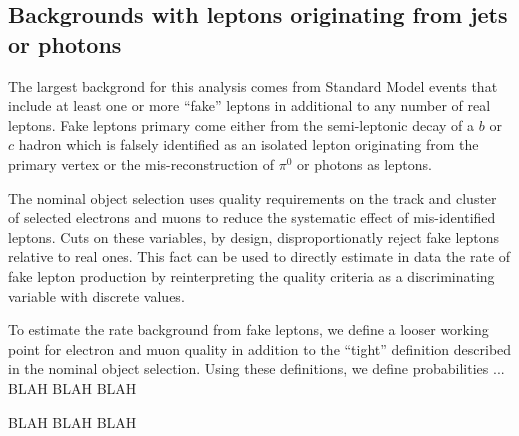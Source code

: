 \subsection{Backgrounds with leptons originating from jets or photons}\label{sect:fakes}

The largest backgrond for this analysis comes from Standard Model events that include at least one or more ``fake'' leptons in additional to any number of real leptons.
Fake leptons primary come either from the semi-leptonic decay of a $b$ or $c$ hadron which is falsely identified as an isolated lepton originating from the primary vertex or the mis-reconstruction of  $\pi^0$ or photons as leptons.


The nominal object selection uses quality requirements on the track and cluster of selected electrons and muons to reduce the systematic effect of mis-identified leptons.
Cuts on these variables, by design, disproportionatly reject fake leptons relative to real ones.
This fact can be used to directly estimate in data the rate of fake lepton production by reinterpreting the quality criteria as a discriminating variable with discrete values.

To estimate the rate background from fake leptons, we define a looser working point for electron and muon quality in addition to the ``tight'' definition described in the nominal object selection.
Using these definitions, we define probabilities ... BLAH BLAH BLAH

BLAH BLAH BLAH


